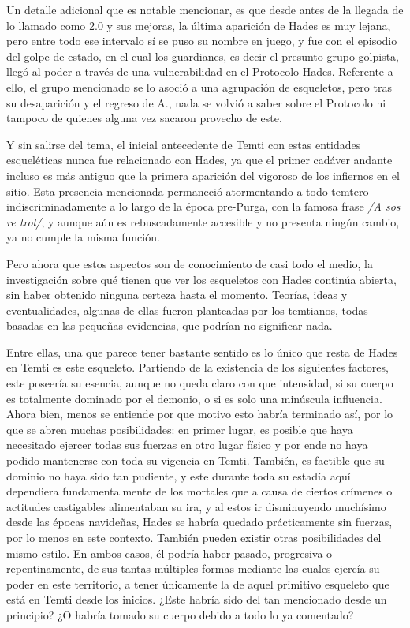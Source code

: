 \documentclass[
]{book}
\begin{document}
Un detalle adicional que es notable mencionar, es que desde antes de la llegada de lo llamado como 2.0 y sus mejoras, la última aparición de Hades es muy lejana, pero entre todo ese intervalo sí se puso su nombre en juego, y fue con el episodio del golpe de estado, en el cual los guardianes, es decir el presunto grupo golpista, llegó al poder a través de una vulnerabilidad en el Protocolo Hades. Referente a ello, el grupo mencionado se lo asoció a una agrupación de esqueletos, pero tras su desaparición y el regreso de A., nada se volvió a saber sobre el Protocolo ni tampoco de quienes alguna vez sacaron provecho de este.

Y sin salirse del tema, el inicial antecedente de Temti con estas entidades esqueléticas nunca fue relacionado con Hades, ya que el primer cadáver andante incluso es más antiguo que la primera aparición del vigoroso de los infiernos en el sitio. Esta presencia mencionada permaneció atormentando a todo temtero indiscriminadamente a lo largo de la época pre-Purga, con la famosa frase \emph{/A sos re trol/}, y aunque aún es rebuscadamente accesible y no presenta ningún cambio, ya no cumple la misma función.

Pero ahora que estos aspectos son de conocimiento de casi todo el medio, la investigación sobre qué tienen que ver los esqueletos con Hades continúa abierta, sin haber obtenido ninguna certeza hasta el momento. Teorías, ideas y eventualidades, algunas de ellas fueron planteadas por los temtianos, todas basadas en las pequeñas evidencias, que podrían no significar nada.

Entre ellas, una que parece tener bastante sentido es lo único que resta de Hades en Temti es este esqueleto. Partiendo de la existencia de los siguientes factores, este poseería su esencia, aunque no queda claro con que intensidad, si su cuerpo es totalmente dominado por el demonio, o si es solo una minúscula influencia. Ahora bien, menos se entiende por que motivo esto habría terminado así, por lo que se abren muchas posibilidades: en primer lugar, es posible que haya necesitado ejercer todas sus fuerzas en otro lugar físico y por ende no haya podido mantenerse con toda su vigencia en Temti. También, es factible que su dominio no haya sido tan pudiente, y este durante toda su estadía aquí dependiera fundamentalmente de los mortales que a causa de ciertos crímenes o actitudes castigables alimentaban su ira, y al estos ir disminuyendo muchísimo desde las épocas navideñas, Hades se habría quedado prácticamente sin fuerzas, por lo menos en este contexto. También pueden existir otras posibilidades del mismo estilo. En ambos casos, él podría haber pasado, progresiva o repentinamente, de sus tantas múltiples formas mediante las cuales ejercía su poder en este territorio, a tener únicamente la de aquel primitivo esqueleto que está en Temti desde los inicios. ¿Este habría sido del tan mencionado desde un principio? ¿O habría tomado su cuerpo debido a todo lo ya comentado?
\end{document}
